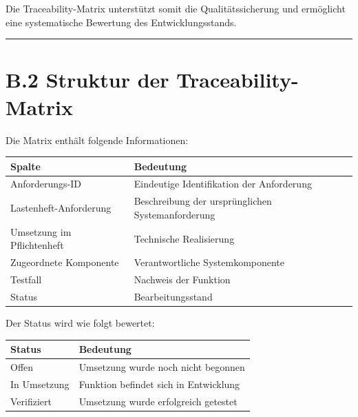 \documentclass[
]{article}
\begin{document}
Die Traceability-Matrix unterstützt somit die Qualitätssicherung und
ermöglicht eine systematische Bewertung des Entwicklungsstands.

\begin{center}\rule{0.5\linewidth}{0.5pt}\end{center}

\section{B.2 Struktur der
Traceability-Matrix}\label{b.2-struktur-der-traceability-matrix}

Die Matrix enthält folgende Informationen:

\begin{longtable}[]{@{}
  >{\raggedright\arraybackslash}p{}
  >{\raggedright\arraybackslash}p{}@{}}
\toprule\noalign{}
\begin{minipage}[b]{\linewidth}\raggedright
Spalte
\end{minipage} & \begin{minipage}[b]{\linewidth}\raggedright
Bedeutung
\end{minipage} \\
\midrule\noalign{}
\endhead
\bottomrule\noalign{}
\endlastfoot
Anforderungs-ID & Eindeutige Identifikation der Anforderung \\
Lastenheft-Anforderung & Beschreibung der ursprünglichen
Systemanforderung \\
Umsetzung im Pflichtenheft & Technische Realisierung \\
Zugeordnete Komponente & Verantwortliche Systemkomponente \\
Testfall & Nachweis der Funktion \\
Status & Bearbeitungsstand \\
\end{longtable}

Der Status wird wie folgt bewertet:

\begin{longtable}[]{@{}ll@{}}
\toprule\noalign{}
Status & Bedeutung \\
\midrule\noalign{}
\endhead
\bottomrule\noalign{}
\endlastfoot
Offen & Umsetzung wurde noch nicht begonnen \\
In Umsetzung & Funktion befindet sich in Entwicklung \\
Verifiziert & Umsetzung wurde erfolgreich getestet \\
\end{longtable}
\end{document}
